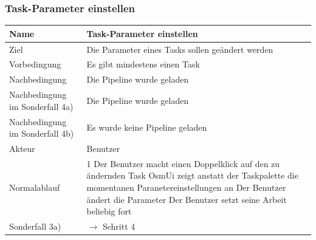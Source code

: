 \documentclass[a4paper,12pt]{scrartcl}
\begin{document}
\subsubsection{Task-Parameter einstellen}
\begin{center}
\begin{tabular}{|p{5cm}|p{10cm}|}
\hline Name & \textbf{Task-Parameter einstellen} \\ 
\hline Ziel & Die Parameter eines Tasks sollen geändert werden\\ 
\hline Vorbedingung & Es gibt mindestens einen Task\\ 
\hline Nachbedingung & Die Pipeline wurde geladen\\  
\hline Nachbedingung im Sonderfall 4a) & Die Pipeline wurde geladen\\
\hline Nachbedingung im Sonderfall 4b) & Es wurde keine Pipeline geladen\\
\hline Akteur & Benutzer \\ 
\hline Normalablauf & 1 Der Benutzer macht einen Doppelklick auf den zu ändernden Task
\newline 2 OsmUi zeigt anstatt der Taskpalette die momentanen Paranetereinstellungen an
\newline 3 Der Benutzer ändert die Parameter
\newline 4 Der Benutzer setzt seine Arbeit beliebig fort\\ 
\hline Sonderfall 3a) & $ \rightarrow$ Schritt 4\\
\hline 
\end{tabular} 
\end{center}
\end{document}
